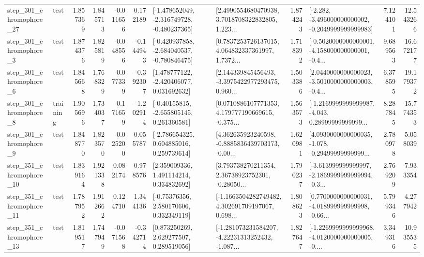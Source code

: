 \begin{tabular}{llrrrrllrlrr}
  step\_301\_chromophore\_27 &      test &      1.857369 &    1.845713 &     -0.011656 &  0.172189 &  [-1.478652049, -2.316749728, -0.480237365] &  [2.4990554680470938, 3.7018708322832805, 1.223... &       1.874243 &  [-2.282, -3.496000000000002, -0.2049999999999983] &            7.124101 &         12.543266 \\
   step\_301\_chromophore\_3 &      test &      1.874376 &    1.825819 &     -0.048556 & -0.144943 &  [-0.420937858, -2.684040537, -0.780846475] &  [0.7837253726137015, 4.064832337361997, 1.7372... &       1.718392 &  [-0.5020000000000001, -4.158000000000001, -0.4... &            9.689563 &         16.672177 \\
   step\_301\_chromophore\_6 &      test &      1.845668 &    1.768329 &     -0.077339 & -0.392307 &    [1.478777122, -2.420406077, 0.031692632] &  [2.144339845456493, -3.3975422977293475, 0.960... &       1.503386 &  [2.0440000000000023, -3.5010000000000003, -0.4... &            6.378595 &         19.179372 \\
   step\_301\_chromophore\_8 &  training &      1.905696 &    1.734037 &     -0.171659 & -1.202914 &    [-0.40155815, -2.655805145, 0.261360581] &  [0.0710886107771353, 4.179777190669615, -0.375... &       1.563573 &  [-1.2169999999999987, -4.043, 0.28999999999999... &            8.287845 &         15.774353 \\
   step\_301\_chromophore\_9 &      test &      1.848770 &    1.823570 &     -0.025200 &  0.055787 &    [-2.786654325, 0.604885016, 0.259739614] &  [4.362635923240598, -0.8885836439703173, -0.00... &       1.620981 &  [4.0930000000000035, -1.078, -0.29499999999999... &            2.780978 &          5.058039 \\
  step\_351\_chromophore\_10 &      test &      1.839164 &    1.921338 &      0.082174 &  0.978576 &     [2.359009336, 1.491114214, 0.334832692] &  [3.793738270211354, 2.36738923752301, -0.28050... &       1.790237 &  [-3.613999999999997, -2.1869999999999994, -0.3... &            2.769209 &          7.933354 \\
  step\_351\_chromophore\_11 &      test &      1.787952 &    1.912662 &      0.124710 &  1.344136 &     [-0.75376356, 2.580170606, 0.332349119] &  [-1.1663504282749482, 4.302691709197067, 0.698... &       1.808623 &  [0.7700000000000031, -4.018999999999998, -0.66... &            5.799346 &          4.277942 \\
  step\_351\_chromophore\_13 &      test &      1.819517 &    1.747949 &     -0.071568 & -0.342714 &     [0.873250269, 2.629277507, 0.289519056] &  [-1.281073231584207, -4.22231313252432, -1.087... &       1.827647 &  [-1.2269999999999968, -4.0120000000000005, -0.... &            3.349316 &         10.935535 \\

\end{tabular}
